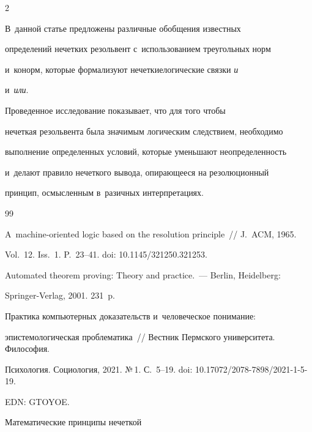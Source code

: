 \begin{multicols}{2}
%


В~данной статье предложены различные обобщения известных 


определений нечетких резольвент с~использованием треугольных норм 


и~конорм, которые формализуют нечеткие\linebreak логические связки \textit{и} 


и~\textit{или}. 


%


Проведенное иссле\-до\-вание показывает, что для того чтобы 


нечеткая резольвента была значимым логическим следствием, необходимо 


выполнение определенных условий, которые уменьшают неопределенность 


и~делают правило нечеткого вывода, опирающееся на резолюционный 


принцип, осмысленным в~разичных интерпретациях.


  


{\small\frenchspacing


 {\baselineskip=11.4pt




 \begin{thebibliography}{99}




 A~machine-oriented logic based on the resolution principle~// J.~ACM, 1965. 


Vol.~12. Iss.~1. P.~23--41. doi: 10.1145/321250.321253.




 Automated theorem proving: Theory and practice.~--- Berlin, Heidelberg: 


Springer-Verlag, 2001. 231~p.




 Практика компьютерных доказательств и~человеческое понимание: 


эпистемологическая проблематика~// Вестник Пермского университета. Философия. 


Психология. Социология, 2021. №\,1. С.~5--19. doi: 10.17072/2078-7898/2021-1-5-19. 


EDN: \mbox{GTOYOE}.




 Математические принципы нечеткой  



\end{thebibliography}}}
\end{multicols}
